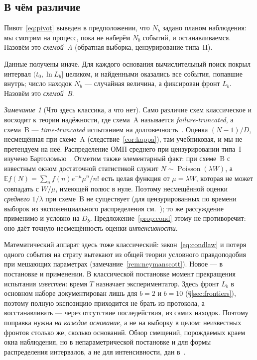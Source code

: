 \documentclass[11pt,a4paper]{article}
\theoremstyle{plain}
\theoremstyle{remark}
\newtheorem{remark}{Замечание}
\DeclareMathOperator{\Pois}{Poisson}
\begin{document}
\subsection{В чём различие}

Пивот~\eqref{eq:pivot} выведен в предположении, что $N_b$ задано планом наблюдения:
мы смотрим на процесс, пока не наберём $N_b$ событий, и останавливаемся. Назовём это
\emph{схемой~A} (обратная выборка, цензурирование типа~II).

Данные получены иначе. Для каждого основания вычислительный поиск покрыл интервал
$(t_0,\ln L_b]$ целиком, и найденными оказались все события, попавшие внутрь; число
находок $N_b$ --- случайная величина, а фиксирован фронт $L_b$. Назовём это
\emph{схемой~B}.

\begin{remark}[Что здесь классика, а что нет]\label{rem:priority}
Само различие схем классическое и восходит к теории надёжности, где схема~A
называется \emph{failure-truncated}, а схема~B --- \emph{time-truncated}
испытанием на долговечность~\cite{epstein1954trunc,epsteinsobel1954}. Оценка
$(N-1)/D$, несмещённая при схеме~A (следствие~\ref{cor:kappa}), там
учебниковая, и мы не претендуем на неё. Распределение ОМП среднего при
цензурировании типа~I изучено Бартоломью~\cite{bartholomew1963}. Отметим также
элементарный факт: при схеме~B с известным окном достаточной статистикой служит
$N\sim\Pois(\lambda W)$, а $\mathbb E f(N)=\sum_nf(n)e^{-\mu}\mu^n/n!$ есть целая
функция от $\mu=\lambda W$, которая не может совпадать с $W/\mu$, имеющей полюс в
нуле. Поэтому несмещённой оценки \emph{среднего} $1/\lambda$ при схеме~B не
существует (для цензурированных по времени выборок из экспоненциального
распределения см.~\cite{sengupta2009}); то же рассуждение применимо и условно на
$D_b$. Предложение~\ref{prop:cond}
этому не противоречит: оно даёт точную несмещённость оценки \emph{интенсивности}.

Математический аппарат здесь тоже классический: закон~\eqref{eq:condlaw} и
потеря одного события на страту вытекают из общей теории условного правдоподобия
при мешающих параметрах (замечание~\ref{rem:neymanscott}). Новое --- в постановке и
применении. В классической постановке момент прекращения
испытания \emph{известен}: время $T$ назначает экспериментатор. Здесь фронт
$L_b$ в основном наборе документирован лишь для $b=2$ и $b=10$
(\S\ref{sec:frontiers}), поэтому полную
экспозицию приходится не брать из протокола, а восстанавливать --- через
отсутствие последействия, из самих находок. Поэтому поправка нужна
\emph{на каждое основание}, а не на выборку в целом: неизвестных фронтов
столько же, сколько оснований. Обзор смещений, порождаемых краем окна
наблюдения, но в непараметрической постановке и для формы распределения
интервалов, а не для интенсивности, дан в~\cite{kivela2015}.


\end{remark}
\end{document}
